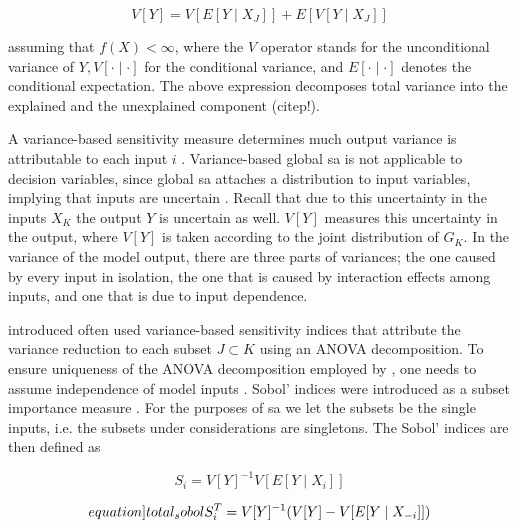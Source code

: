 \begin{equation}
V[Y]= V[E[Y \mid X_J]] + E[V[Y \mid X_J]]
\end{equation}

\noindent assuming that $f(X) < \infty$, where the $V$ operator stands for the unconditional variance of $Y, V[\cdot \mid \cdot]$ for the conditional variance, and $E[\cdot \mid \cdot]$ denotes the conditional expectation. The above expression decomposes total variance into the explained and the unexplained component (citep!).

A variance-based sensitivity measure determines much output variance is attributable to each input $i$ \citep{BP16}. Variance-based global sa is not applicable to decision variables, since global sa attaches a distribution to input variables, implying that inputs are uncertain \citep{SNS16}. Recall that due to this uncertainty in the inputs $X_K$ the output $Y$ is uncertain as well. $V[Y]$ measures this uncertainty in the output, where $V[Y]$ is taken according to the joint distribution of $G_K$. In the variance of the model output, there are three parts of variances; the one caused by every input in isolation, the one that is caused by interaction effects among inputs, and one that is due to input dependence.

\citet{S93} introduced often used variance-based sensitivity indices that attribute the variance reduction to each subset $J \subset K$ using an ANOVA decomposition. To ensure uniqueness of the ANOVA decomposition employed by \citet{S53}, one needs to assume independence of model inputs \citep{GM17}. Sobol' indices were introduced as a subset importance measure \citep{SNS16}. For the purposes of sa we let the subsets be the single inputs, i.e. the subsets under considerations are singletons. The Sobol' indices are then defined as

\begin{equation}
S_i = V[Y]^{-1} V[E[Y \mid X_i]]
\end{equation}

\begin{equation} \label[equation]{total_sobol}
S_i^T = V[Y]^{-1}(V[Y] - V[E[Y \mid {X_{- i}}]])
\end{equation}

